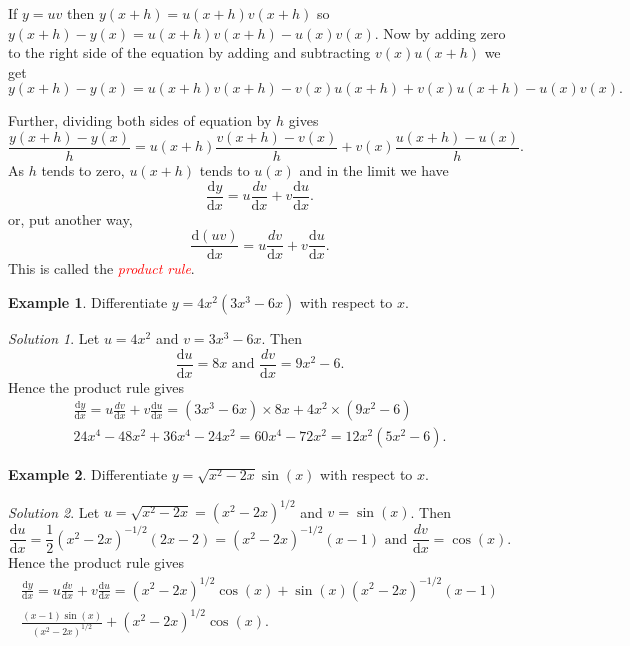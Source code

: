 \documentclass[
  11pt,
  oneside]{book}
\newcommand{\slide}{}
\theoremstyle{definition}
\theoremstyle{definition}
\newtheorem{example}{Example}[chapter]
\theoremstyle{definition}
\theoremstyle{definition}
\theoremstyle{remark}
\newtheorem*{solution}{Solution}
\begin{document}
If \(y = uv\) then \(y(x+h) = u(x+h)v(x+h)\) so \(y(x+h)-y(x) = u(x+h)v(x+h) - u(x)v(x)\). Now by adding zero to the right side of the equation by adding and subtracting \(v(x)u(x+h)\) we get
\[
y(x+h)-y(x) = u(x+h)v(x+h) - v(x)u(x+h) + v(x)u(x+h ) - u(x)v(x).
\]
\slide
Further, dividing both sides of equation by \(h\) gives
\[
\frac{y(x+h)-y(x)}{h} = u(x+h)\frac{v(x+h) - v(x)}{h} + v(x)\frac{u(x+h ) - u(x)}{h}.
\]
As \(h\) tends to zero, \(u(x+h)\) tends to \(u(x)\) and in the limit we have
\[ 
\frac{\mathrm{d} y}{\mathrm{d} x} = u\frac{dv}{\mathrm{d} x} + v\frac{\mathrm{d} u}{\mathrm{d} x}.
\]
or, put another way,
\[ 
\frac{\mathrm{d}(uv)}{\mathrm{d} x} = u\frac{dv}{\mathrm{d} x} + v\frac{\mathrm{d} u}{\mathrm{d} x}.
\]
This is called the \textcolor{red}{\em product rule}.
\slide

\begin{example}
Differentiate \(y=4x^2(3x^3-6x)\) with respect to \(x\).
\end{example}

\begin{solution}
Let \(u = 4x^2\) and \(v = 3x^3-6x\). Then
\[
\frac{\mathrm{d} u}{\mathrm{d} x} = 8x\text{ and }\frac{dv}{\mathrm{d} x} = 9x^2-6.
\]
Hence the product rule gives
\begin{gather*}
\frac{\mathrm{d} y}{\mathrm{d} x} = u\frac{dv}{\mathrm{d} x} + v\frac{\mathrm{d} u}{\mathrm{d} x} = (3x^3-6x)\times 8x + 4x^2\times(9x^2-6)\\
24x^4 - 48x^2 + 36x^4-24x^2 = 60x^4-72x^2 = 12x^2(5x^2-6).
\end{gather*}
\end{solution}

\slide

\begin{example}
Differentiate \(y=\sqrt{x^2-2x}\sin(x)\) with respect to \(x\).
\end{example}

\begin{solution}
Let \(u = \sqrt{x^2-2x} = (x^2-2x)^{1/2}\) and \(v = \sin(x)\). Then
\[
\frac{\mathrm{d} u}{\mathrm{d} x} = \frac12(x^2-2x)^{-1/2}(2x-2)=(x^2-2x)^{-1/2}(x-1)\text{ and }\frac{dv}{\mathrm{d} x} = \cos(x).
\]
Hence the product rule gives
\begin{gather*}
\frac{\mathrm{d} y}{\mathrm{d} x} = u\frac{dv}{\mathrm{d} x} + v\frac{\mathrm{d} u}{\mathrm{d} x} = (x^2-2x)^{1/2}\cos(x) + \sin(x)(x^2-2x)^{-1/2}(x-1)\\
\frac{(x-1)\sin(x)}{(x^2-2x)^{1/2}} + (x^2-2x)^{1/2}\cos(x).
\end{gather*}
\end{solution}
\end{document}
